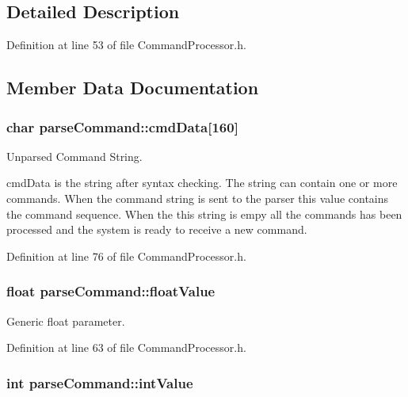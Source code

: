 \subsection{Detailed Description}


Definition at line 53 of file Command\-Processor.\-h.



\subsection{Member Data Documentation}
\hypertarget{structparse_command_a7cb5165cf18cc63d7eed9fa34be4efd8}{
\subsubsection[{cmd\-Data}]{\setlength{\rightskip}{0pt plus 5cm}char parse\-Command\-::cmd\-Data\mbox{[}160\mbox{]}}}\label{structparse_command_a7cb5165cf18cc63d7eed9fa34be4efd8}


Unparsed Command String. 

cmd\-Data is the string after syntax checking. The string can contain one or more commands. When the command string is sent to the parser this value contains the command sequence. When the this string is empy all the commands has been processed and the system is ready to receive a new command. 

Definition at line 76 of file Command\-Processor.\-h.

\hypertarget{structparse_command_a121ded5fdf791ba216ad84cef651fe74}{
\subsubsection[{float\-Value}]{\setlength{\rightskip}{0pt plus 5cm}float parse\-Command\-::float\-Value}}\label{structparse_command_a121ded5fdf791ba216ad84cef651fe74}


Generic float parameter. 



Definition at line 63 of file Command\-Processor.\-h.

\hypertarget{structparse_command_a022bdea84dc5c07ff20af8690a1aa2e3}{
\subsubsection[{int\-Value}]{\setlength{\rightskip}{0pt plus 5cm}int parse\-Command\-::int\-Value}}\label{structparse_command_a022bdea84dc5c07ff20af8690a1aa2e3}


